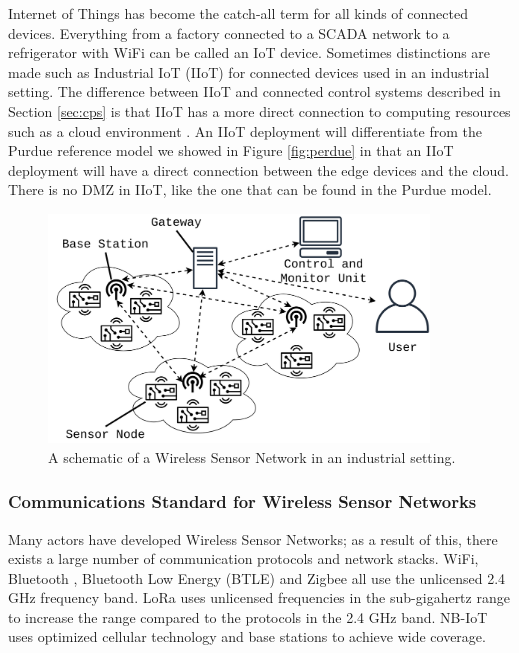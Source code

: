 Internet of Things has become the catch-all term for all kinds of connected devices. Everything from a factory connected to a SCADA network to a refrigerator with WiFi can be called an IoT device. Sometimes distinctions are made such as Industrial IoT (IIoT) for connected devices used in an industrial setting. The difference between IIoT and connected control systems described in Section \ref{sec:cps} is that IIoT has a more direct connection to computing resources such as a cloud environment \cite{mclaughlin2016undiscovered}. An IIoT deployment will differentiate from the Purdue reference model we showed in Figure \ref{fig:perdue} in that an IIoT deployment will have a direct connection between the edge devices and the cloud. There is no DMZ in IIoT, like the one that can be found in the Purdue model.


\begin{figure}[ht]
\centering
\includegraphics[width=0.9\textwidth]{images/WSN.png}
\caption{A schematic of a Wireless Sensor Network in an industrial setting.}
\label{fig:wsn}
\end{figure}

\subsubsection{Communications Standard for Wireless Sensor Networks}
Many actors have developed Wireless Sensor Networks; as a result of this, there exists a large number of communication protocols and network stacks. WiFi, Bluetooth \cite{haartsen2000bluetooth}, Bluetooth Low Energy (BTLE) \cite{heydon2012bluetooth} and Zigbee \cite{alliance2010zigbee} all use the unlicensed 2.4 GHz frequency band. LoRa \cite{sornin2015lora} uses unlicensed frequencies in the sub-gigahertz range to increase the range compared to the protocols in the 2.4 GHz band. NB-IoT\cite{ratasuk2016nb} uses optimized cellular technology and base stations to achieve wide coverage.



